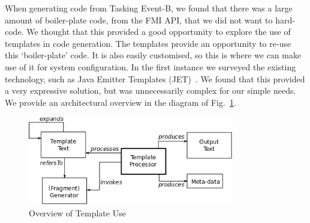 \documentclass{llncs}%
\begin{document}
When generating code from Tasking Event-B, we found that there was a large amount of boiler-plate code, from the FMI API, that we did not want to hard-code. We thought that this provided a good opportunity to explore the use of templates in code generation. The templates provide an opportunity to re-use this `boiler-plate' code. It is also easily customised, so this is where we can make use of it for system configuration. In the first instance we surveyed the existing technology, such as Java Emitter Templates (JET)~\cite{JET}. We found that this provided a very expressive solution, but was unnecessarily complex for our simple needs. We provide an architectural overview in the diagram of Fig.~\ref{fig:templates}.
%
\begin{figure}
\centering
\includegraphics[width=0.8\textwidth]{templateOverview.png}
\caption{Overview of Template Use}
\label{fig:templates}
\end{figure}
%
\end{document}
